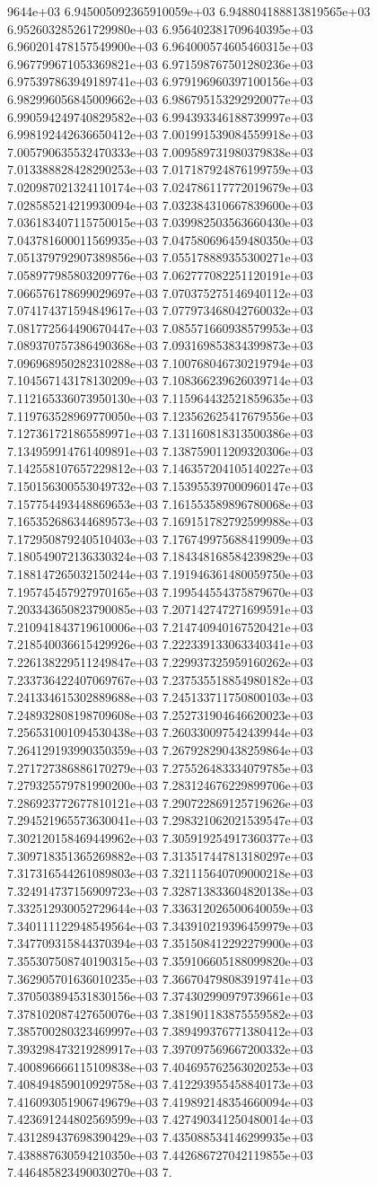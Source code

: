 9644e+03	6.945005092365910059e+03	6.948804188813819565e+03	6.952603285261729980e+03	6.956402381709640395e+03	6.960201478157549900e+03	6.964000574605460315e+03	6.967799671053369821e+03	6.971598767501280236e+03	6.975397863949189741e+03	6.979196960397100156e+03	6.982996056845009662e+03	6.986795153292920077e+03	6.990594249740829582e+03	6.994393346188739997e+03	6.998192442636650412e+03	7.001991539084559918e+03	7.005790635532470333e+03	7.009589731980379838e+03	7.013388828428290253e+03	7.017187924876199759e+03	7.020987021324110174e+03	7.024786117772019679e+03	7.028585214219930094e+03	7.032384310667839600e+03	7.036183407115750015e+03	7.039982503563660430e+03	7.043781600011569935e+03	7.047580696459480350e+03	7.051379792907389856e+03	7.055178889355300271e+03	7.058977985803209776e+03	7.062777082251120191e+03	7.066576178699029697e+03	7.070375275146940112e+03	7.074174371594849617e+03	7.077973468042760032e+03	7.081772564490670447e+03	7.085571660938579953e+03	7.089370757386490368e+03	7.093169853834399873e+03	7.096968950282310288e+03	7.100768046730219794e+03	7.104567143178130209e+03	7.108366239626039714e+03	7.112165336073950130e+03	7.115964432521859635e+03	7.119763528969770050e+03	7.123562625417679556e+03	7.127361721865589971e+03	7.131160818313500386e+03	7.134959914761409891e+03	7.138759011209320306e+03	7.142558107657229812e+03	7.146357204105140227e+03	7.150156300553049732e+03	7.153955397000960147e+03	7.157754493448869653e+03	7.161553589896780068e+03	7.165352686344689573e+03	7.169151782792599988e+03	7.172950879240510403e+03	7.176749975688419909e+03	7.180549072136330324e+03	7.184348168584239829e+03	7.188147265032150244e+03	7.191946361480059750e+03	7.195745457927970165e+03	7.199544554375879670e+03	7.203343650823790085e+03	7.207142747271699591e+03	7.210941843719610006e+03	7.214740940167520421e+03	7.218540036615429926e+03	7.222339133063340341e+03	7.226138229511249847e+03	7.229937325959160262e+03	7.233736422407069767e+03	7.237535518854980182e+03	7.241334615302889688e+03	7.245133711750800103e+03	7.248932808198709608e+03	7.252731904646620023e+03	7.256531001094530438e+03	7.260330097542439944e+03	7.264129193990350359e+03	7.267928290438259864e+03	7.271727386886170279e+03	7.275526483334079785e+03	7.279325579781990200e+03	7.283124676229899706e+03	7.286923772677810121e+03	7.290722869125719626e+03	7.294521965573630041e+03	7.298321062021539547e+03	7.302120158469449962e+03	7.305919254917360377e+03	7.309718351365269882e+03	7.313517447813180297e+03	7.317316544261089803e+03	7.321115640709000218e+03	7.324914737156909723e+03	7.328713833604820138e+03	7.332512930052729644e+03	7.336312026500640059e+03	7.340111122948549564e+03	7.343910219396459979e+03	7.347709315844370394e+03	7.351508412292279900e+03	7.355307508740190315e+03	7.359106605188099820e+03	7.362905701636010235e+03	7.366704798083919741e+03	7.370503894531830156e+03	7.374302990979739661e+03	7.378102087427650076e+03	7.381901183875559582e+03	7.385700280323469997e+03	7.389499376771380412e+03	7.393298473219289917e+03	7.397097569667200332e+03	7.400896666115109838e+03	7.404695762563020253e+03	7.408494859010929758e+03	7.412293955458840173e+03	7.416093051906749679e+03	7.419892148354660094e+03	7.423691244802569599e+03	7.427490341250480014e+03	7.431289437698390429e+03	7.435088534146299935e+03	7.438887630594210350e+03	7.442686727042119855e+03	7.446485823490030270e+03	7.